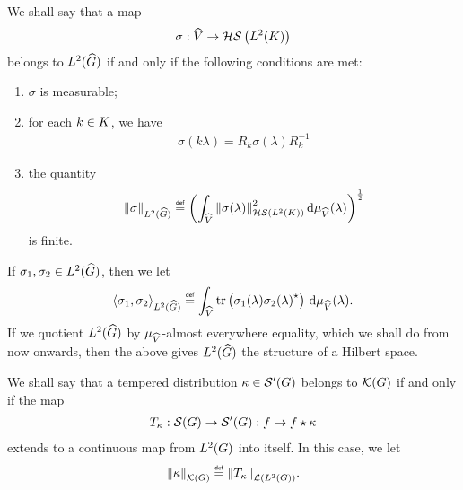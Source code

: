 \begin{definition}
    We shall say that a map
    \begin{align*}
        \sigma : {\widehat{V}} \to {\mathcal{HS} \left({L^{2} (K)}\right)}
    \end{align*}
    belongs to ${L^{2}_{} ({\widehat{G}})}$ if and only if the following conditions are met:
    \begin{enumerate}
        \item $\sigma$ is measurable;
        \item for each $k \in K$, we have
            \begin{align*}
                \sigma(k \lambda) = R_k \sigma(\lambda) R_k^{-1}
            \end{align*}
        \item the quantity
            \begin{align*}
                \norm[\LebesgueDual{2}{\Group}]{\sigma} \defeq
                    \left(
                        \int_\dualGroup{\VectorSpace}
                            \norm[\HilbertSchmidt{\Lebesgue{2}{\CompactGroup}}]{\sigma(\lambda)}^2
                        \dd \Plancherel{\VectorSpace}(\lambda)
                    \right)^{\frac{1}{2}}
            \end{align*}
            is finite.
    \end{enumerate}

    If $\sigma_1, \sigma_2 \in {L^{2}_{} ({\widehat{G}})}$, then we let
    \begin{align*}
        \ip[\LebesgueDual{2}{\Group}]{\sigma_1}{\sigma_2} \defeq
        \int_\dualGroup{\VectorSpace}
            \tr\left(
                \sigma_1(\lambda) \adj{\sigma_2(\lambda)}
            \right)
        \dd \Plancherel{\VectorSpace}(\lambda).
    \end{align*}
    If we quotient ${L^{2}_{} ({\widehat{G}})}$ by $\mu_{{\widehat{V}}}$-almost everywhere equality,
    which we shall do from now onwards,
    then the above gives ${L^{2}_{} ({\widehat{G}})}$ the structure of a Hilbert space.
\end{definition}

\begin{definition}[$\Kernels{\Group}$]
    We shall say that a tempered distribution $\kappa \in {\mathcal{S}' (G)}$ belongs to $\Kernels{\Group}$
    if and only if the map
    \begin{align}
        T_\kappa : {\mathcal{S} (G)} \to {\mathcal{S}' (G)} : f \mapsto f \star \kappa
    \end{align}
    extends to a continuous map from ${L^{2} (G)}$ into itself.
    In this case, we let
    \begin{align*}
        \norm[\Kernels{\Group}]{\kappa} \defeq \norm[\Lin{\Lebesgue{2}{\Group}}]{T_\kappa}.
    \end{align*}
\end{definition}

